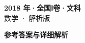 \documentclass[zihao=-4, a4paper]{ctexart}
\begin{document}
\begin{center}
  {\Large\bfseries 2018 年·全国Ⅰ卷·文科}\\[4pt]
  {\large 数学 · 解析版}
\end{center}
\medskip
{}

\clearpage
{}
\begin{center}{\Large\bfseries 参考答案与详细解析}\end{center}
\medskip

\end{document}
